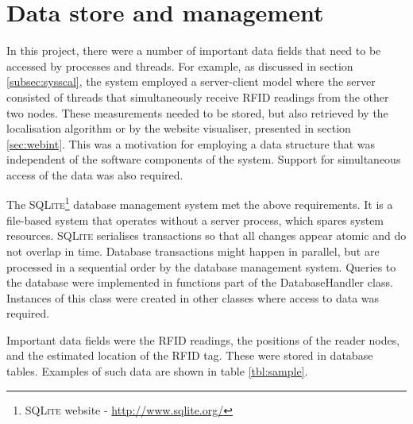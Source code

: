 \section{Data store and management}
\label{sec:dataman}

In this project, there were a number of important data fields that need to be accessed by processes and threads. For example, as discussed in section \ref{subsec:sysscal}, the system employed a server-client model where the server consisted of threads that simultaneously receive RFID readings from the other two nodes. These measurements needed to be stored, but also retrieved by the localisation algorithm or by the website visualiser, presented in section \ref{sec:webint}. This was a motivation for employing a data structure that was independent of the software components of the system. Support for simultaneous access of the data was also required.

The \textsc{SQLite}\footnote{\textsc{SQLite} website - \url{http://www.sqlite.org/}} database management system met the above requirements. It is a file-based system that operates without a server process, which spares system resources. \textsc{SQLite} serialises transactions so that all changes appear atomic and do not overlap in time. Database transactions might happen in parallel, but are processed in a sequential order by the database management system. Queries to the database were implemented in functions part of the \textsf{DatabaseHandler} class. Instances of this class were created in other classes where access to data was required.

Important data fields were the RFID readings, the positions of the reader nodes, and the estimated location of the RFID tag. These were stored in database tables. Examples of such data are shown in table \ref{tbl:sample}.

